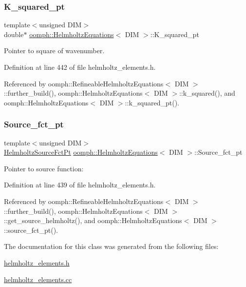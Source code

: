 \subsubsection{\texorpdfstring{K\+\_\+squared\+\_\+pt}{K\_squared\_pt}}
{\footnotesize\ttfamily template$<$unsigned D\+IM$>$ \\
double$\ast$ \hyperlink{classoomph_1_1HelmholtzEquations}{oomph\+::\+Helmholtz\+Equations}$<$ D\+IM $>$\+::K\+\_\+squared\+\_\+pt\hspace{0.3cm}{\ttfamily [protected]}}



Pointer to square of wavenumber. 



Definition at line 442 of file helmholtz\+\_\+elements.\+h.



Referenced by oomph\+::\+Refineable\+Helmholtz\+Equations$<$ D\+I\+M $>$\+::further\+\_\+build(), oomph\+::\+Helmholtz\+Equations$<$ D\+I\+M $>$\+::k\+\_\+squared(), and oomph\+::\+Helmholtz\+Equations$<$ D\+I\+M $>$\+::k\+\_\+squared\+\_\+pt().

\mbox{\label{classoomph_1_1HelmholtzEquations_a896c6598347fd09c47b2aaf57841db85}} 
\subsubsection{\texorpdfstring{Source\+\_\+fct\+\_\+pt}{Source\_fct\_pt}}
{\footnotesize\ttfamily template$<$unsigned D\+IM$>$ \\
\hyperlink{classoomph_1_1HelmholtzEquations_a630648023d91bba9ee9a900353a1ea58}{Helmholtz\+Source\+Fct\+Pt} \hyperlink{classoomph_1_1HelmholtzEquations}{oomph\+::\+Helmholtz\+Equations}$<$ D\+IM $>$\+::Source\+\_\+fct\+\_\+pt\hspace{0.3cm}{\ttfamily [protected]}}



Pointer to source function\+: 



Definition at line 439 of file helmholtz\+\_\+elements.\+h.



Referenced by oomph\+::\+Refineable\+Helmholtz\+Equations$<$ D\+I\+M $>$\+::further\+\_\+build(), oomph\+::\+Helmholtz\+Equations$<$ D\+I\+M $>$\+::get\+\_\+source\+\_\+helmholtz(), and oomph\+::\+Helmholtz\+Equations$<$ D\+I\+M $>$\+::source\+\_\+fct\+\_\+pt().



The documentation for this class was generated from the following files\+:\begin{DoxyCompactItemize}
\item 
\hyperlink{helmholtz__elements_8h}{helmholtz\+\_\+elements.\+h}\item 
\hyperlink{helmholtz__elements_8cc}{helmholtz\+\_\+elements.\+cc}\end{DoxyCompactItemize}
